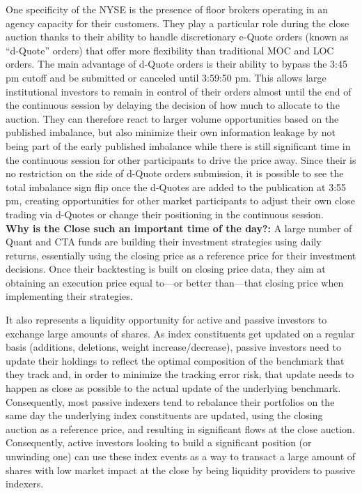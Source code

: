 
One specificity of the NYSE is the presence of floor brokers operating in an agency capacity for their customers. They play a particular role during the close auction thanks to their ability to handle discretionary e-Quote orders (known as ``d-Quote'' orders) that offer more flexibility than traditional MOC and LOC orders. The main advantage of d-Quote orders is their ability to bypass the 3:45 pm cutoff and be submitted or canceled until 3:59:50 pm. This allows large institutional investors to remain in control of their orders almost until the end of the continuous session by delaying the decision of how much to allocate to the auction. They can therefore react to larger volume opportunities based on the published imbalance, but also minimize their own information leakage by not being part of the early published imbalance while there is still significant time in the continuous session for other participants to drive the price away.  Since their is no restriction on the side of d-Quote orders submission, it is possible to see the total imbalance sign flip once the d-Quotes are added to the publication at 3:55 pm, creating opportunities for other market participants to adjust their own close trading via d-Quotes or change their positioning in the continuous session. \\


\noindent\textbf{Why is the Close such an important time of the day?:} A large number of Quant and CTA funds are building their investment strategies using daily returns, essentially using the closing price as a reference price for their investment decisions. Once their backtesting is built on closing price data, they aim at obtaining an execution price equal to---or better than---that closing price when implementing their strategies. 


It also represents a liquidity opportunity for active and passive investors to exchange large amounts of shares. As index constituents get updated on a regular basis (additions, deletions, weight increase/decrease), passive investors need to update their holdings to reflect the optimal composition of the benchmark that they track and, in order to minimize the tracking error risk, that update needs to happen as close as possible to the actual update of the underlying benchmark. Consequently, most passive indexers tend to rebalance their portfolios on the same day the underlying index constituents are updated, using the closing auction as a reference price, and resulting in significant flows at the close auction. Consequently, active investors looking to build a significant position (or unwinding one) can use these index events as a way to transact a large amount of shares with low market impact at the close by being liquidity providers to passive indexers.  




